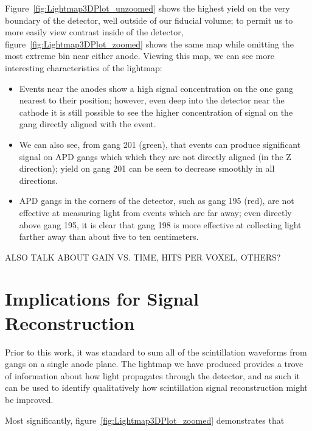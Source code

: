 Figure~\ref{fig:Lightmap3DPlot_unzoomed} shows the highest yield on the very boundary of the detector, well outside of our fiducial volume; to permit us to more easily view contrast inside of the detector, figure~\ref{fig:Lightmap3DPlot_zoomed} shows the same map while omitting the most extreme bin near either anode.  Viewing this map, we can see more interesting characteristics of the lightmap:
\begin{itemize}
\item Events near the anodes show a high signal concentration on the one gang nearest to their position; however, even deep into the detector near the cathode it is still possible to see the higher concentration of signal on the gang directly aligned with the event.
\item We can also see, from gang 201 (green), that events can produce significant signal on APD gangs which which they are not directly aligned (in the Z direction); yield on gang 201 can be seen to decrease smoothly in all directions.
\item APD gangs in the corners of the detector, such as gang 195 (red), are not effective at measuring light from events which are far away; even directly above gang 195, it is clear that gang 198 is more effective at collecting light farther away than about five to ten centimeters.
\end{itemize}

ALSO TALK ABOUT GAIN VS. TIME, HITS PER VOXEL, OTHERS?


\section{Implications for Signal Reconstruction}

Prior to this work, it was standard to sum all of the scintillation waveforms from gangs on a single anode plane.  The lightmap we have produced provides a trove of information about how light propagates through the detector, and as such it can be used to identify qualitatively how scintillation signal reconstruction might be improved.

Most significantly, figure~\ref{fig:Lightmap3DPlot_zoomed} demonstrates that 









